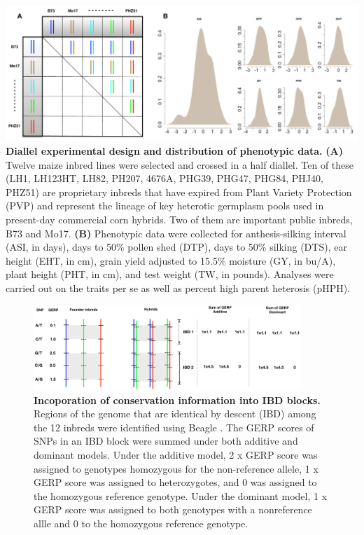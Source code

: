 \documentclass[9pt,twocolumn,twoside]{gsajnl}
\begin{document}
\begin{center}\vspace{1cm}
\includegraphics[width=0.8\linewidth]{SFig_pvp.pdf}
{\color{black} \textbf{Diallel experimental design and distribution of phenotypic data.}
\textbf{(A)} Twelve maize inbred lines were selected and crossed in a half diallel. Ten of these (LH1, LH123HT, LH82, PH207, 4676A, PHG39, PHG47, PHG84, PHJ40, PHZ51) are proprietary inbreds that have expired from Plant Variety Protection (PVP) and represent the lineage of key heterotic germplasm pools used in present-day commercial corn hybrids. Two of them are important public inbreds, B73 and Mo17. \textbf{(B)} Phenotypic data were collected for anthesis-silking interval (ASI, in days), days to 50\% pollen shed (DTP), days to 50\% silking (DTS), ear height (EHT, in cm), grain yield adjusted to 15.5\% moisture (GY, in bu/A), plant height (PHT, in cm), and test weight (TW, in pounds). Analyses were carried out on the traits per se as well as percent high parent heterosis (pHPH).
}
\label{fig:pvp-pheno}
\end{center}\vspace{1cm}




\begin{figure}[here]
\includegraphics[width=0.9\textwidth]{SFig_gerpIBD.pdf}
\caption{
\textbf{Incoporation of conservation information into IBD blocks.}
Regions of the genome that are identical by descent (IBD) among the 12 inbreds were identified using Beagle \citep{Browning2009}.  The GERP scores of SNPs in an IBD block were summed under both additive and dominant models. Under the additive model, 2 x GERP score was assigned to genotypes homozygous for the non-reference allele, 1 x GERP score was assigned to heterozygotes, and 0 was assigned to the homozygous reference genotype. Under the dominant model, 1 x GERP score was assigned to both genotypes with a nonreference allle and 0 to the homozygous reference genotype.}
\label{fig:gerpibd}
\end{figure}
\end{document}
